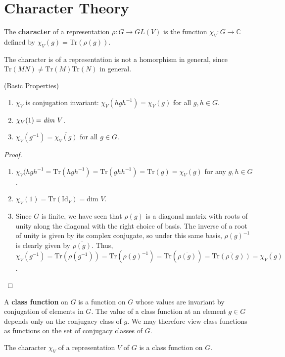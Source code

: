 \section{Character Theory}
\begin{defn}
The \textbf{character} of a representation $\rho \colon G \to GL(V)$ is the function $\chi_V \colon G \to \mathbb{C}$ defined by $\chi_V(g) = \text{Tr}(\rho(g))$.
\end{defn}
\begin{note}
The character is of a representation is not a homorphism in general, since $\text{Tr}(MN) \neq \text{Tr}(M) \text{Tr}(N)$ in general.
\end{note}

\begin{prop} (Basic Properties)
\begin{enumerate}
\item $\chi_V$ is conjugation invariant: $\chi_V (h g h^{-1}) = \chi_V (g)$ for all $g , h \in G$.
\item $\chi_V (1) = \text{\emph{dim }} V$.
\item \label{char-of-inverse} $\chi_V (g^{-1}) = \overline{\chi_V (g)}$ for all $g \in G$.
\end{enumerate}
\end{prop}

\begin{proof}
\begin{enumerate}
\item $\chi_V (h g h^{-1} = \text{Tr}(h g h^{-1}) = \text{Tr}(g h h^{-1}) = \text{Tr} (g) = \chi_V(g)$ for any $g,h \in G$.
\item $\chi_V(1) = \text{Tr}(\text{Id} _V) = \text{dim } V$.
\item Since $G$ is finite, we have seen that $\rho(g)$ is a diagonal matrix with roots of unity along the diagonal with the right choice of basis.  The inverse of a root of unity is given by its complex conjugate, so under this same basis, $\rho(g)^{-1}$ is clearly given by $\overline{\rho(g)}$.  Thus, $\chi_V(g^{-1}) = \text{Tr}(\rho(g^{-1})) = \text{Tr}(\rho(g)^{-1}) = \text{Tr}(\overline{\rho(g)}) = \overline{ \text{Tr} (\rho(g))} = \overline {\chi_V(g)}$.
\end{enumerate}
\end{proof}

\begin{defn}
A \textbf{class function} on $G$ is a function on $G$ whose values are invariant by conjugation of elements in $G$.  The value of a class function at an element $g \in G$ depends only on the conjugacy class of $g$.  We may therefore view class functions as functions on the set of conjugacy classes of $G$.
\end{defn}
\begin{note}
The character $\chi_V$ of a representation $V$ of $G$ is a class function on $G$.
\end{note}


